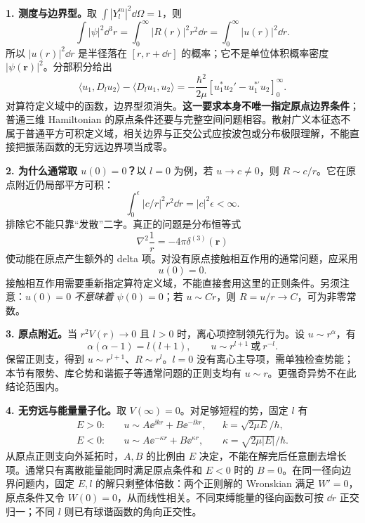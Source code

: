 \textbf{1. 测度与边界型。}取 $\int|Y_l^m|^2\dd\Omega=1$，则
\begin{equation}
  \boxed{\int|\psi|^2\dd^3r
   =\int_0^\infty|R(r)|^2r^2\dd r
   =\int_0^\infty|u(r)|^2\dd r.}
\end{equation}
所以 $|u(r)|^2\dd r$ 是半径落在 $[r,r+\dd r]$ 的概率；它不是单位体积概率密度 $|\psi(\mathbf r)|^2$。分部积分给出
\begin{equation}
  \langle u_1,D_lu_2\rangle-\langle D_lu_1,u_2\rangle
  =-\frac{\hbar^2}{2\mu}
    [u_1^*u_2'-u_1^{*\prime}u_2]_0^\infty.
\end{equation}
对算符定义域中的函数，边界型须消失。\textbf{这一要求本身不唯一指定原点边界条件}；普通三维 Hamiltonian 的原点条件还要与完整空间问题相容。散射广义本征态不属于普通平方可积定义域，相关边界与正交公式应按波包或分布极限理解，不能直接把振荡函数的无穷远边界项当成零。

\textbf{2. 为什么通常取 $u(0)=0$？}以 $l=0$ 为例，若 $u\to c\ne0$，则 $R\sim c/r$。它在原点附近仍局部平方可积：
\begin{equation}
  \int_0^\epsilon |c/r|^2r^2\dd r=|c|^2\epsilon<\infty.
\end{equation}
排除它不能只靠“发散”二字。真正的问题是分布恒等式
\begin{equation}
  \nabla^2\frac1r=-4\pi\delta^{(3)}(\mathbf r)
\end{equation}
使动能在原点产生额外的 delta 项。对没有原点接触相互作用的通常问题，应采用
\begin{equation}
  \boxed{u(0)=0.}
\end{equation}
接触相互作用需要重新指定算符定义域，不能直接套用这里的正则条件。另须注意：$u(0)=0$ \emph{不意味着} $\psi(0)=0$；若 $u\sim Cr$，则 $R=u/r\to C$，可为非零常数。

\textbf{3. 原点附近。}当 $r^2V(r)\to0$ 且 $l>0$ 时，离心项控制领先行为。设 $u\sim r^\alpha$，有
\begin{equation}
  \alpha(\alpha-1)=l(l+1),\qquad
  u\sim r^{l+1}\ \text{或}\ r^{-l}.
\end{equation}
保留正则支，得到 $u\sim r^{l+1}$、$R\sim r^l$。$l=0$ 没有离心主导项，需单独检查势能；本节有限势、库仑势和谐振子等通常问题的正则支均有 $u\sim r$。更强奇异势不在此结论范围内。

\textbf{4. 无穷远与能量量子化。}取 $V(\infty)=0$。对足够短程的势，固定 $l$ 有
\begin{equation}
  \begin{aligned}
    E>0:&\quad u\sim A\ee^{\ii kr}+B\ee^{-\ii kr},
       &&k=\sqrt{2\mu E}/\hbar,\\
    E<0:&\quad u\sim A\ee^{-\kappa r}+B\ee^{\kappa r},
       &&\kappa=\sqrt{2\mu|E|}/\hbar.
  \end{aligned}
\end{equation}
从原点正则支向外延拓时，$A,B$ 的比例由 $E$ 决定，不能在解完后任意删去增长项。通常只有离散能量能同时满足原点条件和 $E<0$ 时的 $B=0$。在同一径向边界问题内，固定 $E,l$ 的解只剩整体倍数：两个正则解的 Wronskian 满足 $W'=0$，原点条件又令 $W(0)=0$，从而线性相关。不同束缚能量的径向函数可按 $\dd r$ 正交归一；不同 $l$ 则已有球谐函数的角向正交性。

